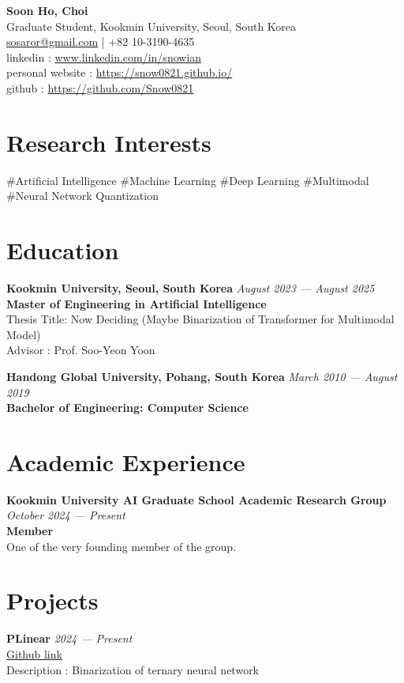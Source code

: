 \documentclass[11pt, a4paper]{article}
\newcommand{\itemheader}[2]{
    \noindent\textbf{#1} \hfill \textit{#2} \\
}
\begin{document}
{\huge \textbf{Soon Ho, Choi}}\\[0.1cm]
Graduate Student, Kookmin University, Seoul, South Korea \\
\href{mailto:sosaror@gmail.com}{sosaror@gmail.com} | +82 10-3190-4635 \\
linkedin : \href{https://www.linkedin.com/in/snowian}{www.linkedin.com/in/snowian} \\
personal website : \href{https://snow0821.github.io/}{https://snow0821.github.io/} \\
github : \href{https://github.com/Snow0821}{https://github.com/Snow0821}

\vspace{0.3cm}

\section*{Research Interests}
\noindent
\#Artificial Intelligence \#Machine Learning \#Deep Learning \#Multimodal \\
\#Neural Network Quantization

\section*{Education}
\itemheader{Kookmin University, Seoul, South Korea}{August 2023 — August 2025}
\textbf{Master of Engineering in Artificial Intelligence} \\
Thesis Title: Now Deciding (Maybe Binarization of Transformer for Multimodal Model) \\
Advisor : Prof. Soo-Yeon Yoon

\vspace{0.3cm}

\itemheader{Handong Global University, Pohang, South Korea}{March 2010 — August 2019}
\textbf{Bachelor of Engineering: Computer Science} 

\section*{Academic Experience}
\itemheader{Kookmin University AI Graduate School Academic Research Group}{October 2024 — Present}
\textbf{Member} \\
One of the very founding member of the group.

\vspace{0.3cm}

\section*{Projects}
\itemheader{PLinear}{2024 — Present}
\href{https://github.com/Snow0821/plinear}{Github link}\\
Description : Binarization of ternary neural network\\
\end{document}
